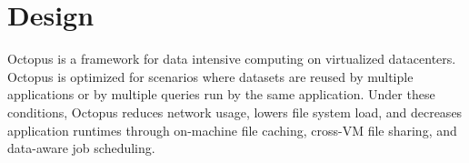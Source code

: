 \section{Design}
\label{sec:design}


Octopus is a framework for data intensive computing on virtualized
datacenters. Octopus is optimized for scenarios where datasets are
reused by multiple applications or by multiple queries run by the same
application.  Under these conditions, Octopus reduces network usage,
lowers file system load, and decreases application runtimes through
on-machine file caching, cross-VM file sharing, and data-aware job
scheduling.

